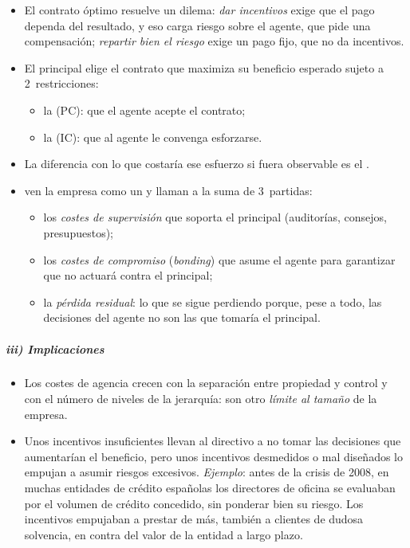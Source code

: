 \documentclass[11pt]{article}
\begin{document}
\begin{itemize}
\item El contrato óptimo resuelve un dilema: \emph{dar incentivos} exige que el pago dependa del resultado, y eso carga riesgo sobre el agente, que pide una compensación; \emph{repartir bien el riesgo} exige un pago fijo, que no da incentivos\nocite{Holmstrom1979Moral}.
\item El principal elige el contrato que maximiza su beneficio esperado sujeto a 2~restricciones:
  \begin{itemize}
  \item la  (PC): que el agente acepte el contrato;
  \item la  (IC): que al agente le convenga esforzarse.
  \end{itemize}
\item La diferencia con lo que costaría ese esfuerzo si fuera observable es el  .
\item \textcite{JensenMeckling1976Theory} ven la empresa como un  y llaman  a la suma de 3~partidas:
  \begin{itemize}
  \item los \emph{costes de supervisión} que soporta el principal (auditorías, consejos, presupuestos);
  \item los \emph{costes de compromiso} (\emph{bonding}) que asume el agente para garantizar que no actuará contra el principal;
  \item la \emph{pérdida residual}: lo que se sigue perdiendo porque, pese a todo, las decisiones del agente no son las que tomaría el principal.
  \end{itemize}
\end{itemize}

\subparagraph{iii) Implicaciones}

\begin{itemize}
\item Los costes de agencia crecen con la separación entre propiedad y control y con el número de niveles de la jerarquía: son otro \emph{límite al tamaño} de la empresa.
\item Unos incentivos insuficientes llevan al directivo a no tomar las decisiones que aumentarían el beneficio, pero unos incentivos desmedidos o mal diseñados lo empujan a asumir riesgos excesivos. \emph{Ejemplo}: antes de la crisis de 2008, en muchas entidades de crédito españolas los directores de oficina se evaluaban por el volumen de crédito concedido, sin ponderar bien su riesgo. Los incentivos empujaban a prestar de más, también a clientes de dudosa solvencia, en contra del valor de la entidad a largo plazo.
\end{itemize}
\end{document}
